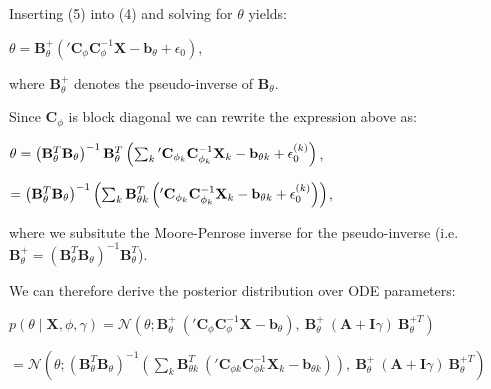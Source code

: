\begin{par}
Inserting (5) into (4) and solving for $\theta$ yields:
\end{par} \vspace{1em}
\begin{par}
$\theta = \mathbf{B}_{\theta}^+ \left( {'\mathbf{C}_{\phi}} \mathbf{C}_{\phi}^{-1} \mathbf{X} - \mathbf{b}_{\theta} + \epsilon_0 \right)$,
\end{par} \vspace{1em}
\begin{par}
where $\mathbf{B}_{\theta}^+$ denotes the pseudo-inverse of $\mathbf{B}_{\theta}$.
\end{par} \vspace{1em}
\begin{par}
Since $\mathbf{C}_{\phi}$ is block diagonal we can rewrite the expression above as:
\end{par} \vspace{1em}
\begin{par}
$\theta = \left( \mathbf{B}_{\theta}^T \mathbf{B}_{\theta} \right)^{-1} \mathbf{B}_{\theta}^T  \left( \sum_k {'\mathbf{C}_{\phi_k}} \mathbf{C}_{\boldmath\phi_k}^{-1} \mathbf{X}_k - \mathbf{b}_{\theta k} + \boldmath\epsilon_0^{(k)} \right)$,
\end{par} \vspace{1em}
\begin{par}
$= \left( \mathbf{B}_{\theta}^T \mathbf{B}_{\theta} \right)^{-1} \left( \sum_k \mathbf{B}_{\theta k}^T \left( {'\mathbf{C}_{\phi_k}} \mathbf{C}_{\boldmath\phi_k}^{-1} \mathbf{X}_k - \mathbf{b}_{\theta k} + \boldmath\epsilon_0^{(k)} \right) \right)$,
\end{par} \vspace{1em}
\begin{par}
where we subsitute the Moore-Penrose inverse for the pseudo-inverse (i.e. $\mathbf{B}_{\theta}^+ = \left( \mathbf{B}_{\theta}^T \mathbf{B}_{\theta} \right)^{-1} \mathbf{B}_{\theta}^T$).
\end{par} \vspace{1em}
\begin{par}
We can therefore derive the posterior distribution over ODE parameters:
\end{par} \vspace{1em}
\begin{par}
$p(\theta \mid \mathbf{X}, \phi, \gamma) = \mathcal{N}\left(\theta ; \mathbf{B}_{\theta}^+ ~ \left( {'\mathbf{C}_{\phi}} \mathbf{C}_{\phi}^{-1} \mathbf{X} - \mathbf{b}_{\theta} \right), ~ \mathbf{B}_{\theta}^+ ~ (\mathbf{A} + \mathbf{I}\gamma) ~ \mathbf{B}_{\theta}^{+T} \right)$
\end{par} \vspace{1em}
\begin{par}
$= \mathcal{N}\left(\theta ; \left( \mathbf{B}_{\theta}^T \mathbf{B}_{\theta} \right)^{-1} \left( \sum_k \mathbf{B}_{\theta k}^T ~ \left( {'\mathbf{C}_{\phi k}} \mathbf{C}_{\phi k}^{-1} \mathbf{X}_k - \mathbf{b}_{\theta k} \right) \right), ~ \mathbf{B}_{\theta}^+ ~ (\mathbf{A} + \mathbf{I}\gamma) ~ \mathbf{B}_{\theta}^{+T} \right)$
\end{par} \vspace{1em}

